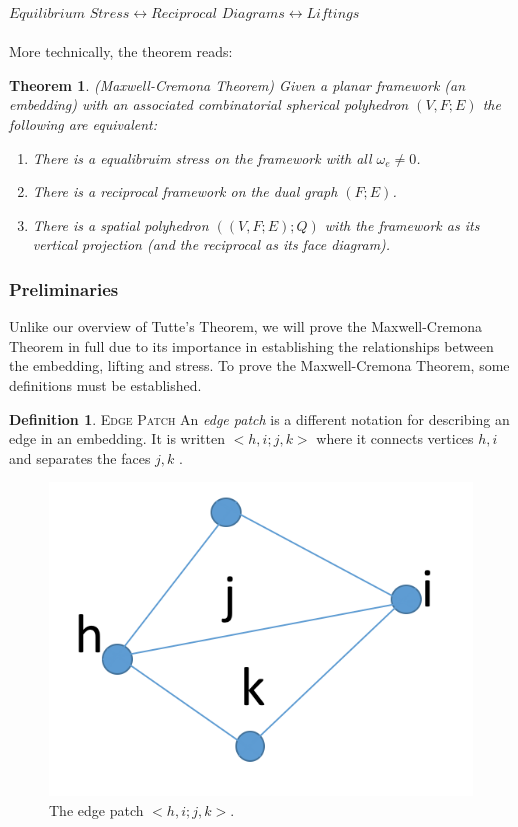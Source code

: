 \documentclass[11pt]{article}
\newtheorem{theorem}{Theorem}[section]
\theoremstyle{definition}
\newtheorem{definition}{Definition}[section]
\begin{document}
 
 	$Equilibrium$  $Stress \leftrightarrow Reciprocal$ $Diagrams \leftrightarrow Liftings$ \\
	\\
	More technically, the theorem reads:
	\begin{theorem}{(Maxwell-Cremona Theorem)} 
	Given a planar framework (an embedding) with an associated combinatorial spherical polyhedron $(V,F;E)$ the following are equivalent:
		\begin{enumerate}
			\item There is a equalibruim stress on the framework with all $\omega_e \neq 0$.
			\item There is a reciprocal framework on the dual graph $(F;E)$.
			\item There is a spatial polyhedron $((V,F;E);Q)$ with the framework as its vertical projection (and the reciprocal as its face diagram).
 		\end{enumerate}
	\end{theorem}

 
\subsubsection{Preliminaries}
	Unlike our overview of Tutte's Theorem, we will prove the Maxwell-Cremona Theorem in full due to its importance in establishing the relationships between the embedding, lifting and stress. 
	To prove the Maxwell-Cremona Theorem, some definitions must be established. 
	\theoremstyle{definition}
	\begin{definition}{\textsc{Edge Patch}}
		An \emph{edge patch} is a different notation for describing an edge in an embedding. 
		It is written $<h,i;j,k>$ where it connects vertices $h,i$ and separates the faces $j,k$ \cite{mccProof}.
	\end{definition}
	
	\begin{figure}
  		\begin{center}
  			\includegraphics[width=.23\textwidth]{edge_patch2}
  		\end{center}
  		\caption{The edge patch $<h,i;j,k>$.}
	\end{figure}
	
\end{document}
